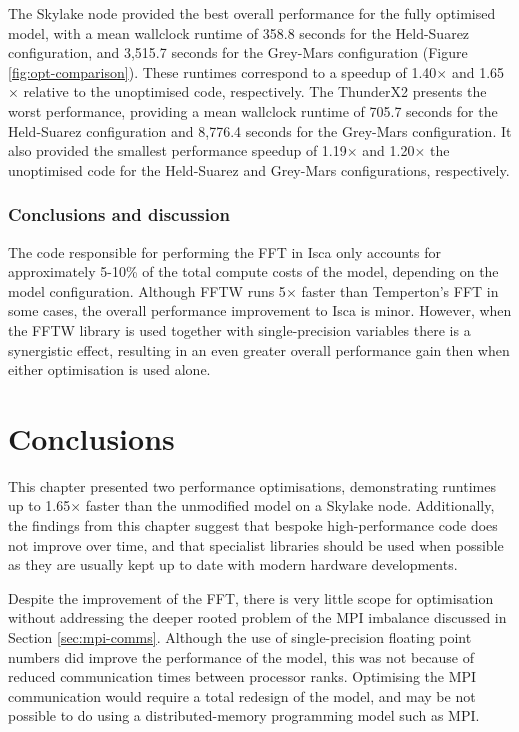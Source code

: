 \documentclass[a4paper,11pt]{report}
\begin{document}
The Skylake node provided the best overall performance for the fully optimised model, with a mean wallclock runtime of 358.8 seconds for the Held-Suarez configuration, and 3,515.7 seconds for the Grey-Mars configuration  (Figure \ref{fig:opt-comparison}). These runtimes correspond to a speedup of 1.40$\times$ and 1.65$\times$ relative to the unoptimised code, respectively.  The ThunderX2 presents the worst performance, providing a mean wallclock runtime of 705.7 seconds for the Held-Suarez configuration and 8,776.4 seconds for the Grey-Mars configuration. It also provided the smallest performance speedup of 1.19$\times$ and 1.20$\times$ the unoptimised code for the Held-Suarez and Grey-Mars configurations, respectively. 
\par

\subsubsection{Conclusions and discussion}
The code responsible for performing the FFT in Isca only accounts for approximately 5-10\% of the total compute costs of the model, depending on the model configuration. Although FFTW runs 5$\times$ faster than Temperton's FFT in some cases, the overall performance improvement to Isca is minor. However, when the FFTW library is used together with single-precision variables there is a synergistic effect, resulting in an even greater overall performance gain then when either optimisation is used alone. 
\par



\section{Conclusions}
This chapter presented two performance optimisations, demonstrating runtimes up to 1.65$\times$ faster than the unmodified model on a Skylake node. Additionally, the findings from this chapter suggest that bespoke high-performance code does not improve over time, and that specialist libraries should be used when possible as they are usually kept up to date with modern hardware developments.
\par
Despite the improvement of the FFT, there is very little scope for optimisation without addressing the deeper rooted problem of the MPI imbalance discussed in Section \ref{sec:mpi-comms}. Although the use of single-precision floating point numbers did improve the performance of the model, this was not because of reduced communication times between processor ranks. Optimising the MPI communication would require a total redesign of the model, and may be not possible to do using a distributed-memory programming model such as MPI.
\end{document}
